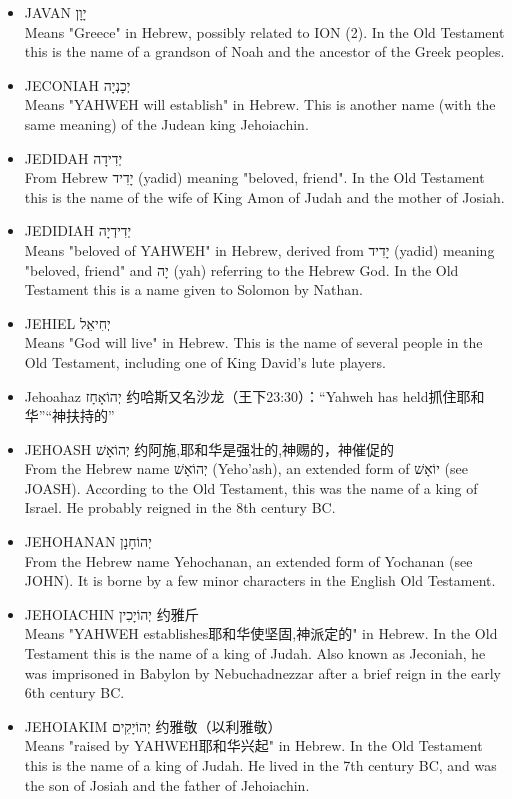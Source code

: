 \begin{itemize}
\item JAVAN יָוָן \\
Means "Greece" in Hebrew, possibly related to ION (2). In the Old Testament this is the name of a grandson of Noah and the ancestor of the Greek peoples.
\item JECONIAH יְכָנְיָה \\
Means "YAHWEH will establish" in Hebrew. This is another name (with the same meaning) of the Judean king Jehoiachin.
\item JEDIDAH יְדִידָה \\
From Hebrew יָדִיד (yadid) meaning "beloved, friend". In the Old Testament this is the name of the wife of King Amon of Judah and the mother of Josiah.
\item JEDIDIAH יְדִידְיָה \\
Means "beloved of YAHWEH" in Hebrew, derived from יָדִיד (yadid) meaning "beloved, friend" and יָה (yah) referring to the Hebrew God. In the Old Testament this is a name given to Solomon by Nathan.
\item JEHIEL יְחִיאֵל \\
Means "God will live" in Hebrew. This is the name of several people in the Old Testament, including one of King David's lute players.
\item Jehoahaz יְהוֹאָחָז 约哈斯又名沙龙（王下23:30）：“Yahweh has held抓住耶和华”“神扶持的”
\item JEHOASH יְהוֹאָשׁ 约阿施,耶和华是强壮的,神赐的，神催促的\\
From the Hebrew name יְהוֹאָשׁ (Yeho'ash), an extended form of יוֹאָשׁ (see JOASH). According to the Old Testament, this was the name of a king of Israel. He probably reigned in the 8th century BC.
\item JEHOHANAN יְהוֹחָנָן \\
From the Hebrew name Yehochanan, an extended form of Yochanan (see JOHN). It is borne by a few minor characters in the English Old Testament.
\item JEHOIACHIN יְהוֹיָכִין 约雅斤\\
Means "YAHWEH establishes耶和华使坚固,神派定的" in Hebrew. In the Old Testament this is the name of a king of Judah. Also known as Jeconiah, he was imprisoned in Babylon by Nebuchadnezzar after a brief reign in the early 6th century BC.
\item JEHOIAKIM יְהוֹיָקִים 约雅敬（以利雅敬）\\
Means "raised by YAHWEH耶和华兴起" in Hebrew. In the Old Testament this is the name of a king of Judah. He lived in the 7th century BC, and was the son of Josiah and the father of Jehoiachin.

\end{itemize}
